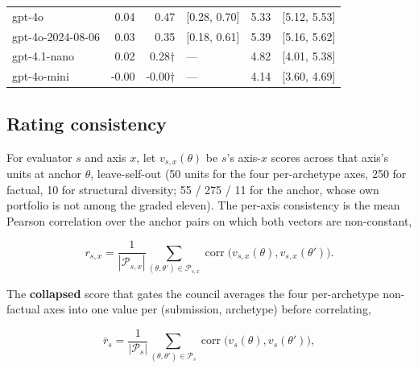 \documentclass{article}
\begin{document}
\begin{table}[H]
\begin{center}
{\begin{tabular}{@{}lrrlrl@{}}
gpt-4o &\cellcolor[HTML]{F9FDCC}\textcolor[HTML]{000000}{0.04}&\cellcolor[HTML]{F8FCCA}\textcolor[HTML]{000000}{0.47}& {[}0.28, 0.70{]} &\cellcolor[HTML]{37ACC3}\textcolor[HTML]{FFFFFF}{5.33}& {[}5.12, 5.53{]}  \\
gpt-4o-2024-08-06 &\cellcolor[HTML]{FBFDCF}\textcolor[HTML]{000000}{0.03}&\cellcolor[HTML]{FAFDCE}\textcolor[HTML]{000000}{0.35}& {[}0.18, 0.61{]} &\cellcolor[HTML]{36AAC3}\textcolor[HTML]{FFFFFF}{5.39}& {[}5.16, 5.62{]}  \\
gpt-4.1-nano &\cellcolor[HTML]{FCFED3}\textcolor[HTML]{000000}{0.02}&\cellcolor[HTML]{FBFDD0}\textcolor[HTML]{000000}{0.28\ensuremath{\dagger}}& --- &\cellcolor[HTML]{4AB9C3}\textcolor[HTML]{000000}{4.82}& {[}4.01, 5.38{]}  \\
gpt-4o-mini &\cellcolor[HTML]{FFFFD9}\textcolor[HTML]{000000}{-0.00}&\cellcolor[HTML]{FFFFD9}\textcolor[HTML]{000000}{-0.00\ensuremath{\dagger}}& --- &\cellcolor[HTML]{6CC6BE}\textcolor[HTML]{000000}{4.14}& {[}3.60, 4.69{]}  \\
\bottomrule
\end{tabular}}
\end{center}
\end{table}

\subsection{Rating consistency}\label{rating-consistency}

For evaluator \(s\) and axis \(x\), let \(v_{s,x}(\theta)\) be \(s\)'s axis-\(x\) scores across that axis's units at anchor \(\theta\), leave-self-out (50 units for the four per-archetype axes, 250 for factual, 10 for structural diversity; 55 / 275 / 11 for the anchor, whose own portfolio is not among the graded eleven). The per-axis consistency is the mean Pearson correlation over the anchor pairs on which both vectors are non-constant,

\[ r_{s,x}=\frac{1}{|\mathcal P_{s,x}|}\sum_{(\theta,\theta')\in\mathcal P_{s,x}}\operatorname{corr}\!\big(v_{s,x}(\theta),v_{s,x}(\theta')\big). \tag{A10}\]

The \textbf{collapsed} score that gates the council averages the four per-archetype non-factual axes into one value per (submission, archetype) before correlating,

\[ \bar r_s=\frac{1}{|\mathcal P_{s}|}\sum_{(\theta,\theta')\in\mathcal P_{s}}\operatorname{corr}\!\big(v_{s}(\theta),v_{s}(\theta')\big), \tag{A11}\]
\end{document}
